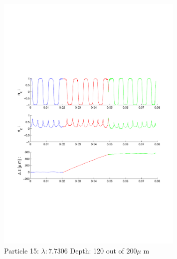 \begin{figure}[H]

\includegraphics[width=0.8\textwidth]{Images/Particle 15/Particle15.pdf}

\caption{Particle 15:  $ \lambda: 7.7306$ Depth: 120 out of $200 \mu $ m}

\centering

\end{figure}

